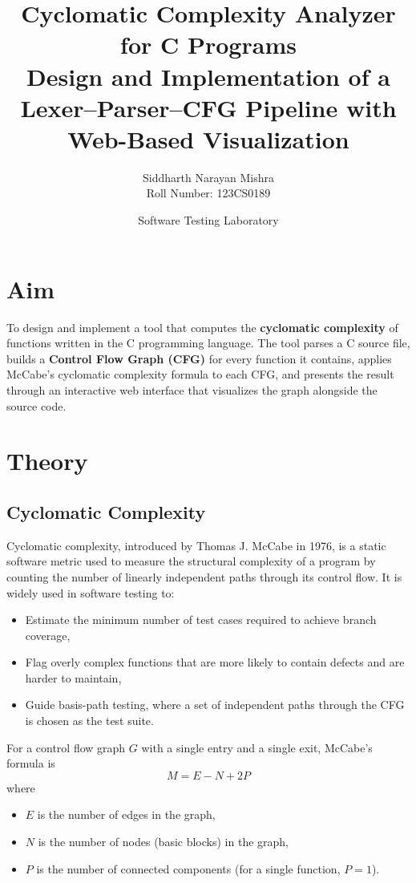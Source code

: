 \documentclass[11pt]{article}
\title{\textbf{Cyclomatic Complexity Analyzer for C Programs} \\
\large Design and Implementation of a Lexer--Parser--CFG Pipeline with Web-Based Visualization}
\author{Siddharth Narayan Mishra \\ Roll Number: 123CS0189}
\date{Software Testing Laboratory}
\begin{document}
\maketitle

\section{Aim}
To design and implement a tool that computes the \textbf{cyclomatic complexity} of functions written in the C programming language. The tool parses a C source file, builds a \textbf{Control Flow Graph (CFG)} for every function it contains, applies McCabe's cyclomatic complexity formula to each CFG, and presents the result through an interactive web interface that visualizes the graph alongside the source code.

\section{Theory}

\subsection{Cyclomatic Complexity}
Cyclomatic complexity, introduced by Thomas J. McCabe in 1976, is a static software metric used to measure the structural complexity of a program by counting the number of linearly independent paths through its control flow. It is widely used in software testing to:
\begin{itemize}
    \item Estimate the minimum number of test cases required to achieve branch coverage,
    \item Flag overly complex functions that are more likely to contain defects and are harder to maintain,
    \item Guide basis-path testing, where a set of independent paths through the CFG is chosen as the test suite.
\end{itemize}

For a control flow graph $G$ with a single entry and a single exit, McCabe's formula is
\begin{equation}
    M = E - N + 2P
\end{equation}
where
\begin{itemize}
    \item $E$ is the number of edges in the graph,
    \item $N$ is the number of nodes (basic blocks) in the graph,
    \item $P$ is the number of connected components (for a single function, $P = 1$).
\end{itemize}
\end{document}
